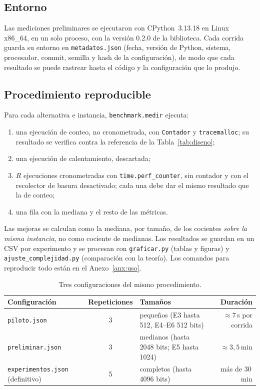 \subsection{Entorno}

Las mediciones preliminares se ejecutaron con CPython~3.13.18 en Linux x86\_64,
en un solo proceso, con la versión 0.2.0 de la biblioteca. Cada corrida guarda
su entorno en \texttt{metadatos.json} (fecha, versión de Python, sistema,
procesador, commit, semilla y hash de la configuración), de modo que cada
resultado se puede rastrear hasta el código y la configuración que lo produjo.

\subsection{Procedimiento reproducible}

Para cada alternativa e instancia, \texttt{benchmark.medir} ejecuta:
\begin{enumerate}
  \item una ejecución de conteo, no cronometrada, con \texttt{Contador} y \texttt{tracemalloc};
        su resultado se verifica contra la referencia de la Tabla~\ref{tab:diseno};
  \item una ejecución de calentamiento, descartada;
  \item $R$ ejecuciones cronometradas con \texttt{time.perf\_counter}, sin contador y con el
        recolector de basura desactivado; cada una debe dar el mismo resultado que la de conteo;
  \item una fila con la mediana y el resto de las métricas.
\end{enumerate}
Las mejoras se calculan como la mediana, por tamaño, de los cocientes \emph{sobre
la misma instancia}, no como cociente de medianas. Los resultados se guardan en
un CSV por experimento y se procesan con \texttt{graficar.py} (tablas y figuras)
y \texttt{ajuste\_complejidad.py} (comparación con la teoría). Los comandos para
reproducir todo están en el Anexo~\ref{anx:uso}.

\begin{table}[H]
\centering\small
\caption{Tres configuraciones del mismo procedimiento.}
\begin{tabularx}{\linewidth}{@{}l c Y r@{}}
\toprule
\textbf{Configuración} & \textbf{Repeticiones} & \textbf{Tamaños} & \textbf{Duración}\\
\midrule
\texttt{piloto.json} & 3 & pequeños (E3 hasta 512, E4--E6 512 bits) & $\approx 7$\,s por corrida\\
\texttt{preliminar.json} & 3 & medianos (hasta 2048 bits; E5 hasta 1024) & $\approx 3{,}5$\,min\\
\texttt{experimentos.json} (definitivo) & 5 & completos (hasta 4096 bits) & más de 30\,min\\
\bottomrule
\end{tabularx}
\end{table}

